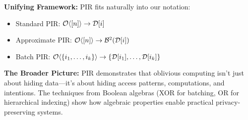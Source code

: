 \documentclass[11pt,final]{article}
\newcommand{\DB}{\mathcal{D}}
\begin{document}
\textbf{Unifying Framework:}
PIR fits naturally into our notation:
\begin{itemize}
    \item Standard PIR: $\Obv{[n]} \to \DB[i]$
    \item Approximate PIR: $\Obv{[n]} \to \Bernoulli{\DB[i]}{2}$
    \item Batch PIR: $\Obv{\{i_1, \ldots, i_k\}} \to \{\DB[i_1], \ldots, \DB[i_k]\}$
\end{itemize}

\textbf{The Broader Picture:}
PIR demonstrates that oblivious computing isn't just about hiding data—it's about hiding access patterns, computations, and intentions. The techniques from Boolean algebras (XOR for batching, OR for hierarchical indexing) show how algebraic properties enable practical privacy-preserving systems.


\end{document}
